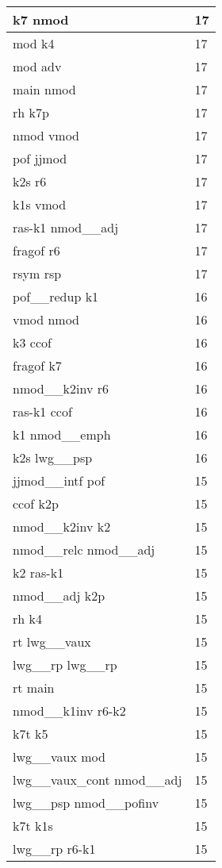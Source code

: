 \documentclass[a4 paper]{article}
\begin{document}
\begin{longtable}{p{}p{}}
k7 nmod  & 17 \\ \midrule
mod k4  & 17 \\ \midrule
mod adv  & 17 \\ \midrule
main nmod  & 17 \\ \midrule
rh k7p  & 17 \\ \midrule
nmod vmod  & 17 \\ \midrule
pof jjmod  & 17 \\ \midrule
k2s r6  & 17 \\ \midrule
k1s vmod  & 17 \\ \midrule
ras-k1 nmod\_\_adj  & 17 \\ \midrule
fragof r6  & 17 \\ \midrule
rsym rsp  & 17 \\ \midrule
pof\_\_redup k1  & 16 \\ \midrule
vmod nmod  & 16 \\ \midrule
k3 ccof  & 16 \\ \midrule
fragof k7  & 16 \\ \midrule
nmod\_\_k2inv r6  & 16 \\ \midrule
ras-k1 ccof  & 16 \\ \midrule
k1 nmod\_\_emph  & 16 \\ \midrule
k2s lwg\_\_psp  & 16 \\ \midrule
jjmod\_\_intf pof  & 15 \\ \midrule
ccof k2p  & 15 \\ \midrule
nmod\_\_k2inv k2  & 15 \\ \midrule
nmod\_\_relc nmod\_\_adj  & 15 \\ \midrule
k2 ras-k1  & 15 \\ \midrule
nmod\_\_adj k2p  & 15 \\ \midrule
rh k4  & 15 \\ \midrule
rt lwg\_\_vaux  & 15 \\ \midrule
lwg\_\_rp lwg\_\_rp  & 15 \\ \midrule
rt main  & 15 \\ \midrule
nmod\_\_k1inv r6-k2  & 15 \\ \midrule
k7t k5  & 15 \\ \midrule
lwg\_\_vaux mod  & 15 \\ \midrule
lwg\_\_vaux\_cont nmod\_\_adj  & 15 \\ \midrule
lwg\_\_psp nmod\_\_pofinv  & 15 \\ \midrule
k7t k1s  & 15 \\ \midrule
lwg\_\_rp r6-k1  & 15 \\ \midrule

\end{longtable}
\end{document}
